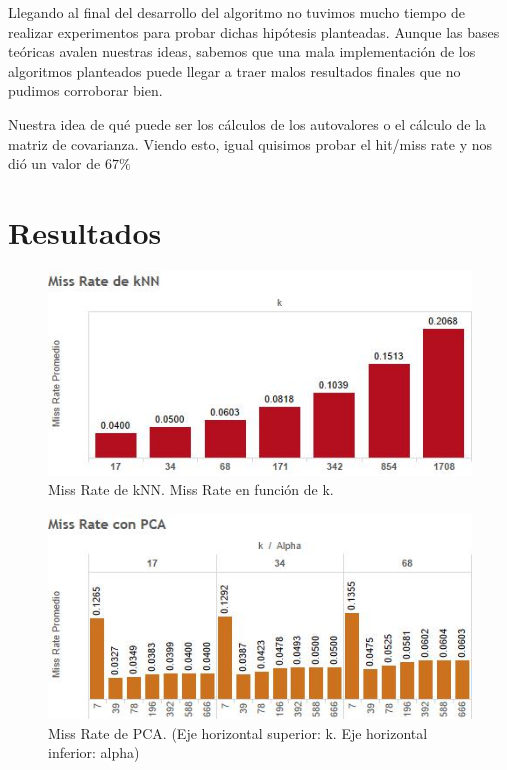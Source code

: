 \documentclass{article}
\begin{document}
  
  Llegando al final del desarrollo del algoritmo no tuvimos mucho tiempo de realizar experimentos para probar dichas hipótesis planteadas. Aunque las bases teóricas avalen nuestras ideas, sabemos que una mala implementación de los algoritmos planteados puede llegar a traer malos resultados finales que no pudimos corroborar bien.
  
  Nuestra idea de qué puede ser los cálculos de los autovalores o el cálculo de la matriz de covarianza. Viendo esto, igual quisimos probar el hit/miss rate y nos dió un valor de $67\%$
 

\section*{Resultados}{}
\begin{figure}[H]
\centering
\includegraphics[scale=0.90]{MissRatedekNN.jpg}
\caption{Miss Rate de kNN. Miss Rate en función de k.}
\label{fig:MissRatekNN}
\end{figure}

\begin{figure}[H]
\centering
\includegraphics[scale=0.90]{MissRatedePCA.jpg}
\caption{Miss Rate de PCA. (Eje horizontal superior: k. Eje horizontal inferior: alpha)}
\label{fig:MissRatePCA}
\end{figure}
\end{document}
